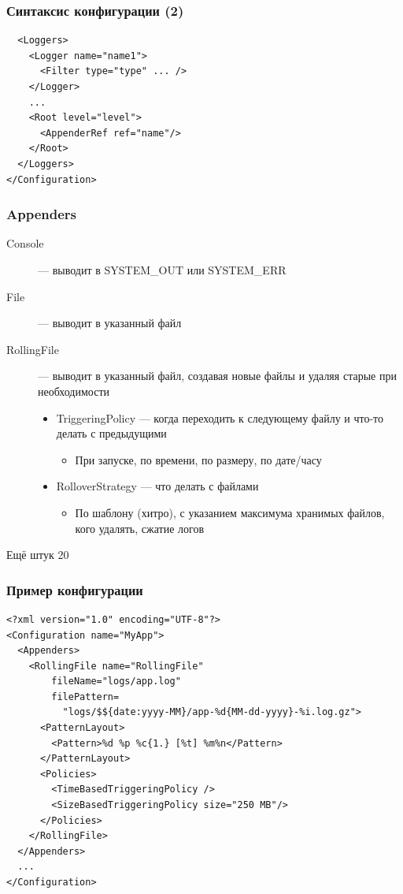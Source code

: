 \documentclass[xetex,mathserif,serif]{beamer}
\begin{document}
	\begin{frame}[fragile]
		\frametitle{Синтаксис конфигурации (2)}
		\begin{verbatim}
  <Loggers>
    <Logger name="name1">
      <Filter type="type" ... />
    </Logger>
    ...
    <Root level="level">
      <AppenderRef ref="name"/>
    </Root>
  </Loggers>
</Configuration>
		\end{verbatim}
	\end{frame}

	\begin{frame}
		\frametitle{Appenders}
		\begin{description}
			\item [Console] --- выводит в SYSTEM\_OUT или SYSTEM\_ERR
			\item [File] --- выводит в указанный файл
			\item [RollingFile] --- выводит в указанный файл, создавая новые файлы и удаляя старые при необходимости
			\begin{itemize}
				\item TriggeringPolicy --- когда переходить к следующему файлу и что-то делать с предыдущими
				\begin{itemize}
					\item При запуске, по времени, по размеру, по дате/часу
				\end{itemize}
				\item RolloverStrategy --- что делать с файлами
				\begin{itemize}
					\item По шаблону (хитро), с указанием максимума хранимых файлов, кого удалять, сжатие логов
				\end{itemize}
			\end{itemize}
			\item [Ещё штук 20]
		\end{description}
	\end{frame}

	\begin{frame}[fragile]
		\frametitle{Пример конфигурации}
		\begin{footnotesize}
			\begin{verbatim}
<?xml version="1.0" encoding="UTF-8"?>
<Configuration name="MyApp">
  <Appenders>
    <RollingFile name="RollingFile" 
        fileName="logs/app.log"
        filePattern=
          "logs/$${date:yyyy-MM}/app-%d{MM-dd-yyyy}-%i.log.gz">
      <PatternLayout>
        <Pattern>%d %p %c{1.} [%t] %m%n</Pattern>
      </PatternLayout>
      <Policies>
        <TimeBasedTriggeringPolicy />
        <SizeBasedTriggeringPolicy size="250 MB"/>
      </Policies>
    </RollingFile>
  </Appenders>
  ...
</Configuration>
			\end{verbatim}
		\end{footnotesize}
\end{frame}
\end{document}

